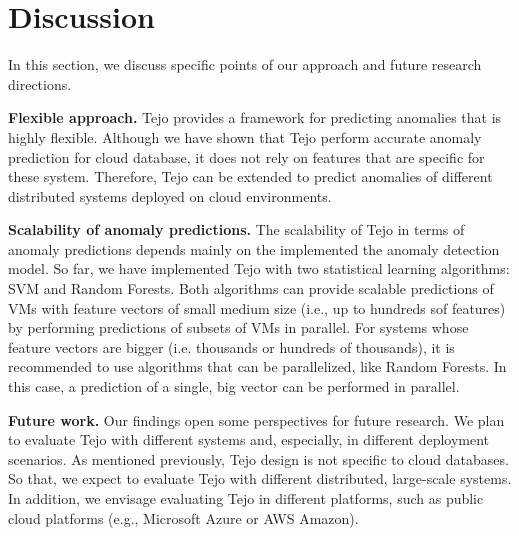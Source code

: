 \section{Discussion}

In this section, we discuss specific points of our approach and future research directions.

\noindent
{\bf Flexible approach.} Tejo provides a framework for predicting anomalies that is highly flexible. Although we have shown that Tejo perform accurate anomaly prediction for cloud database, it does not rely on features that are specific for these system. Therefore, Tejo can be extended to predict anomalies of different distributed systems deployed on cloud environments. 

\noindent
{\bf Scalability of anomaly predictions.} The scalability of Tejo in terms of anomaly predictions depends mainly on the implemented the anomaly detection model. So far, we have implemented Tejo with two statistical learning algorithms: SVM and Random Forests.  Both algorithms can provide scalable predictions of VMs with feature vectors of small medium size (i.e., up to hundreds sof features) by performing predictions of subsets of VMs in parallel. For systems whose feature vectors are bigger (i.e. thousands or hundreds of thousands), it is recommended to use algorithms that can be parallelized, like Random Forests. In this case, a prediction of a single, big vector can be performed in parallel.

\noindent
{\bf Future work.} Our findings open some perspectives for future research. We plan to evaluate Tejo with different systems and, especially, in different deployment scenarios. As mentioned previously, Tejo design is not specific to cloud databases. So that, we expect to evaluate Tejo with different distributed, large-scale systems. In addition, we envisage evaluating Tejo in different platforms, such as public cloud platforms (e.g., Microsoft Azure or AWS Amazon).